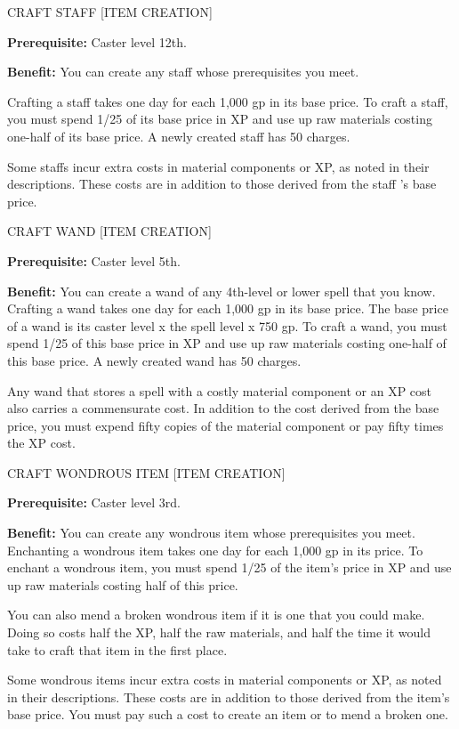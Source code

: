 \documentclass{article}
\begin{document}
\vspace{12pt}
CRAFT STAFF [ITEM CREATION]

\textbf{Prerequisite:} Caster level 12th.

\textbf{Benefit:} You can create any staff whose prerequisites you meet.

Crafting a staff takes one day for each 1,000 gp in its base price. To craft a 
staff, you must spend 1/25 of its base price in XP and use up raw materials costing 
one-half of its base price. A newly created staff has 50 charges.

Some staffs incur extra costs in material components or XP, as noted in their descriptions. 
These costs are in addition to those derived from the staff 's base price.

\vspace{12pt}
CRAFT WAND [ITEM CREATION]

\textbf{Prerequisite:} Caster level 5th.

\textbf{Benefit:} You can create a wand of any 4th-level or lower spell that you 
know. Crafting a wand takes one day for each 1,000 gp in its base price. The base 
price of a wand is its caster level x $ $the spell level x 750 gp. To craft a wand, 
you must spend 1/25 of this base price in XP and use up raw materials costing one-half 
of this base price. A newly created wand has 50 charges.

Any wand that stores a spell with a costly material component or an XP cost also 
carries a commensurate cost. In addition to the cost derived from the base price, 
you must expend fifty copies of the material component or pay fifty times the XP 
cost.

\vspace{12pt}
CRAFT WONDROUS ITEM [ITEM CREATION]

\textbf{Prerequisite:} Caster level 3rd.

\textbf{Benefit:} You can create any wondrous item whose prerequisites you meet. 
Enchanting a wondrous item takes one day for each 1,000 gp in its price. To enchant 
a wondrous item, you must spend 1/25 of the item's price in XP and use up raw materials 
costing half of this price.

You can also mend a broken wondrous item if it is one that you could make. Doing 
so costs half the XP, half the raw materials, and half the time it would take to 
craft that item in the first place.

Some wondrous items incur extra costs in material components or XP, as noted in 
their descriptions. These costs are in addition to those derived from the item's 
base price. You must pay such a cost to create an item or to mend a broken one.
\end{document}
